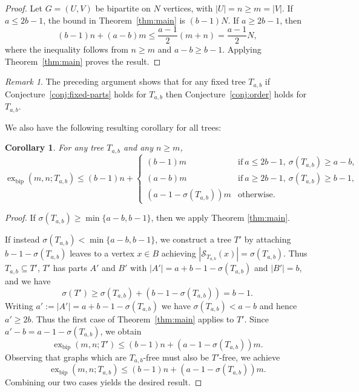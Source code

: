 \documentclass[12pt]{article}
\newtheorem{corollary}[theorem]{Corollary}
\theoremstyle{definition}
\theoremstyle{remark}
\newtheorem{remark}[theorem]{Remark}
\newcommand{\exbip}{\operatorname{ex}_{\mathrm{bip}}}
\begin{document}
\begin{proof}
Let $G=(U,V)$ be bipartite on $N$ vertices, with $|U|=n\ge m=|V|$. If $a\le 2b-1$, the bound in Theorem~\ref{thm:main} is $(b-1)N$. If $a\ge 2b-1$, then
\[
(b-1)n+(a-b)m\le \frac{a-1}{2}(m+n)=\frac{a-1}{2}N,
\]
where the inequality follows from $n\ge m$ and $a-b\ge b-1$. Applying Theorem~\ref{thm:main} proves the result.
\end{proof}

\begin{remark}
\label{rmk:fixed-implies-order}
    The preceding argument shows that for any fixed tree $T_{a,b}$ if Conjecture~\ref{conj:fixed-parts} holds for $T_{a,b}$ then Conjecture~\ref{conj:order} holds for $T_{a,b}$.
\end{remark}

\noindent We also have the following resulting corollary for all trees:
\begin{corollary}
\label{cor:weak-general}
For any tree $T_{a,b}$ and any $n\geq m$,
\[
    \exbip(m,n;T_{a,b})\le(b-1)n+\begin{cases}
    (b-1)m&\text{if}\ a\leq2b-1,\ \sigma(T_{a,b})\geq a-b,\\
    (a-b)m&\text{if}\ a\geq2b-1,\ \sigma(T_{a,b})\geq b-1,\\
    (a-1-\sigma(T_{a,b}))m&\text{otherwise}.
    \end{cases}
\]
\end{corollary}
\begin{proof}
    If $\sigma(T_{a,b})\geq\min\{a-b,b-1\}$, then we apply Theorem \ref{thm:main}. 
    
    \noindent If instead $\sigma(T_{a,b})<\min\{a-b,b-1\}$, we construct a tree $T'$ by attaching $b-1-\sigma(T_{a,b})$ leaves to a vertex $x\in B$ achieving $|\mathcal S_{T_{a,b}}(x)|=\sigma(T_{a,b})$. Thus $T_{a,b}\subseteq T'$, $T'$ has parts $A'$ and $B'$ with $|A'|=a+b-1-\sigma(T_{a,b})$ and $|B'|=b$, and we have
    \[
    \sigma(T')\geq\sigma(T_{a,b})+(b-1-\sigma(T_{a,b}))=b-1.
    \]
    Writing $a':=|A'|=a+b-1-\sigma(T_{a,b})$ we have $\sigma(T_{a,b})<a-b$ and hence $a'\geq 2b$. Thus the first case of Theorem~\ref{thm:main} applies to $T'$. Since $a'-b=a-1-\sigma(T_{a,b})$, we obtain
    \[
    \exbip(m,n;T')\leq(b-1)n+(a-1-\sigma(T_{a,b}))m.
    \]
    Observing that graphs which are $T_{a,b}$-free must also be $T'$-free, we achieve
    \[
    \exbip(m,n;T_{a,b})\leq(b-1)n+(a-1-\sigma(T_{a,b}))m.
    \]
    Combining our two cases yields the desired result.
\end{proof}
\end{document}
